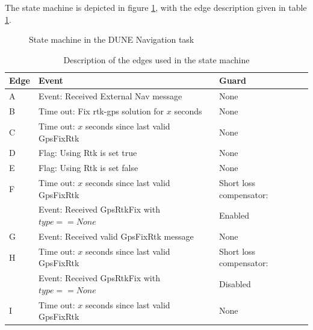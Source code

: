 The state machine is depicted in figure \ref{Fig:NavState}, with the edge description given in table \ref{Tb:Nav state edge}.
\newpage
\begin{figure}[H]
\def\svgwidth{\textwidth} %

\caption{State machine in the DUNE Navigation task}
\label{Fig:NavState}
\end{figure}
\begin{table}[H]

    \begin{tabular}{ | p{1cm} | p{8cm} | | p{4cm} |}
    \hline
    \textbf{Edge} 	& \textbf{Event} 										& \textbf{Guard} \\ \hline
    A 				& Event: Received External Nav message 					& None \\ \hline
    B 				& Time out: Fix \gls{rtk-gps} solution for $x$ seconds 	& None \\ \hline
    C 				& Time out: $x$ seconds since last valid GpsFixRtk 		& None \\ \hline
    D 				& Flag: Using Rtk is set true& None \\ \hline
    E 				& Flag: Using Rtk is set false& None \\ \hline
    F 				& Time out: $x$ seconds since last valid GpsFixRtk 		& Short loss compensator:\\ 
      				& Event: Received GpsRtkFix with $type==None$ 			& Enabled\\ \hline
    G 				& Event: Received valid GpsFixRtk message				& None \\ \hline
    H 				& Time out: $x$ seconds since last valid GpsFixRtk 		& Short loss compensator:\\
    				& Event: Received GpsRtkFix with $type==None$			& Disabled \\ \hline
    I 				& Time out: $x$ seconds since last valid GpsFixRtk 		& None \\ \hline
    \end{tabular}

\caption{Description of the edges used in the state machine}
\label{Tb:Nav state edge}
\end{table}
